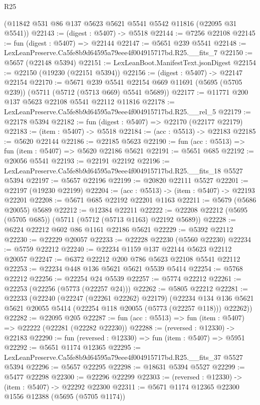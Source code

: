 \begin{lexlean}{R25}
\begin{coremodule}
    (@11842 @531 @86 @137 @5623 @5621 @5541 @5542 @11816 (@22095 @31 @5541))
@22143 := (digest : @5407) -> @5518
@22144 := @7256 @22108
@22145 := fun (digest : @5407) => @22144
@22147 := @5651 @239 @5541
@22148 := LexLeanPreserve.Ca5fe8b9d64595a79eee4f004915717bd.R25.__fits_7
@22150 := @5657 (@22148 @5394)
@22151 := LexLeanBoot.ManifestText.jsonDigest
@22154 := @22150 (@19230 (@22151 @5394))
@22156 := (digest : @5407) -> @22147 @22154
@22170 := @5671
    @239
    @5541
    @22154
    @669
    @11691
    (@5695 (@5705 @239))
    (@5711 (@5712 (@5713 @669) @5541 @5689))
@22177 := @11771 @200 @137 @5623 @22108 @5541 @22112 @11816
@22178 := LexLeanPreserve.Ca5fe8b9d64595a79eee4f004915717bd.R25.__rel_5
@22179 := @22178 @5394
@22182 := fun (digest : @5407) => @22170 (@22177 @22179)
@22183 := (item : @5407) -> @5518
@22184 := (acc : @5513) -> @22183
@22185 := @5620 @22144
@22186 := @22185 @5623
@22190 := fun (acc : @5513) => fun (item : @5407) => @5620 @22186 @5621
@22191 := @5651 @685
@22192 := @20056 @5541
@22193 := @22191 @22192
@22196 := LexLeanPreserve.Ca5fe8b9d64595a79eee4f004915717bd.R25.__fits_18 @5527 @5394
@22197 := @5657 @22196
@22199 := @20820 @22111 @5527
@22201 := @22197 (@19230 @22199)
@22204 := (acc : @5513) -> (item : @5407) -> @22193 @22201
@22208 := @5671 @685 @22192 @22201 @1163
@22211 := @5679 (@5686 @20055) @5689
@22212 := @12384 @22211
@22222 := @22208 @22212 (@5695 (@5705 @685)) (@5711 (@5712 (@5713 @1163) @22192 @5689))
@22228 := @6224 @22212 @602 @86 @1161 @22186 @5621
@22229 := @5392 @22112
@22230 := @22229 @20057
@22233 := @22228 @22230 (@5560 @22230)
@22234 := @5759 @22212
@22240 := @22234 @1159 @137 @22144 @5623 @22112 @20057
@22247 := @6372 @22212 @200 @786 @5623 @22108 @5541 @22112
@22253 := @22234 @448 @136 @5621 @5621 @5539 @5414
@22254 := @5768 @22212
@22256 := @22254 @24 @5539
@22257 := @5774 @22212
@22261 := @22253 (@22256 (@5773 (@22257 @24)))
@22262 := @5805 @22212
@22281 := @22233
    (@22240
      (@22247 (@22261 @22262) @22179)
      (@22234 @134 @136 @5621 @5621 @20055 @5414 (@22254 @118 @20055 (@5773 (@22257 @118))) @22262))
@22282 := @22095 @205
@22287 := fun (acc : @5513) => fun (item : @5407) => @22222 (@22281 (@22282 @22230))
@22288 := (reversed : @12330) -> @22183
@22290 := fun (reversed : @12330) => fun (item : @5407) => @5951
@22292 := @5651 @1174 @12365
@22295 := LexLeanPreserve.Ca5fe8b9d64595a79eee4f004915717bd.R25.__fits_37 @5527 @5394
@22296 := @5657 @22295
@22298 := @18631 @5394 @5527
@22299 := @5477 @22298
@22300 := @22296 @22299
@22303 := (reversed : @12330) -> (item : @5407) -> @22292 @22300
@22311 := @5671 @1174 @12365 @22300 @1556 @12388 (@5695 (@5705 @1174))

\end{coremodule}
\end{lexlean}
